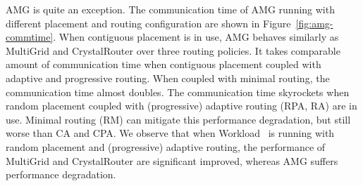 AMG is quite an exception. 
The communication time of AMG running with different placement and routing configuration are shown in Figure~\ref{fig:amg-commtime}.
When contiguous placement is in use, AMG behaves similarly as MultiGrid and CrystalRouter over three routing policies. 
It takes comparable amount of communication time when contiguous placement coupled with adaptive and progressive routing. 
When coupled with minimal routing, the communication time almost doubles. 
The communication time skyrockets when random placement coupled with (progressive) adaptive routing (RPA, RA) are in use. Minimal routing (RM) can mitigate this performance degradation, but still worse than CA and CPA. We observe that when Workload~ is running with random placement and (progressive) adaptive routing, 
the performance of MultiGrid and CrystalRouter are significant improved, whereas AMG suffers performance degradation. 


